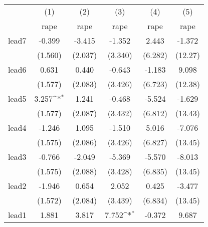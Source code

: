 {
\def\sym#1{\ifmmode^{#1}\else\(^{#1}\)\fi}
\begin{tabular}{l*{5}{c}}
\hline\hline
            &\multicolumn{1}{c}{(1)}&\multicolumn{1}{c}{(2)}&\multicolumn{1}{c}{(3)}&\multicolumn{1}{c}{(4)}&\multicolumn{1}{c}{(5)}\\
            &\multicolumn{1}{c}{rape}&\multicolumn{1}{c}{rape}&\multicolumn{1}{c}{rape}&\multicolumn{1}{c}{rape}&\multicolumn{1}{c}{rape}\\
\hline
lead7       &      -0.399         &      -3.415         &      -1.352         &       2.443         &      -1.372         \\
            &     (1.560)         &     (2.037)         &     (3.340)         &     (6.282)         &     (12.27)         \\
[1em]
lead6       &       0.631         &       0.440         &      -0.643         &      -1.183         &       9.098         \\
            &     (1.577)         &     (2.083)         &     (3.426)         &     (6.723)         &     (12.38)         \\
[1em]
lead5       &       3.257\sym{*}  &       1.241         &      -0.468         &      -5.524         &      -1.629         \\
            &     (1.577)         &     (2.087)         &     (3.432)         &     (6.812)         &     (13.43)         \\
[1em]
lead4       &      -1.246         &       1.095         &      -1.510         &       5.016         &      -7.076         \\
            &     (1.575)         &     (2.086)         &     (3.426)         &     (6.827)         &     (13.45)         \\
[1em]
lead3       &      -0.766         &      -2.049         &      -5.369         &      -5.570         &      -8.013         \\
            &     (1.575)         &     (2.088)         &     (3.428)         &     (6.835)         &     (13.45)         \\
[1em]
lead2       &      -1.946         &       0.654         &       2.052         &       0.425         &      -3.477         \\
            &     (1.572)         &     (2.084)         &     (3.439)         &     (6.834)         &     (13.45)         \\
[1em]
lead1       &       1.881         &       3.817         &       7.752\sym{*}  &      -0.372         &       9.687         \\

\end{tabular}}
